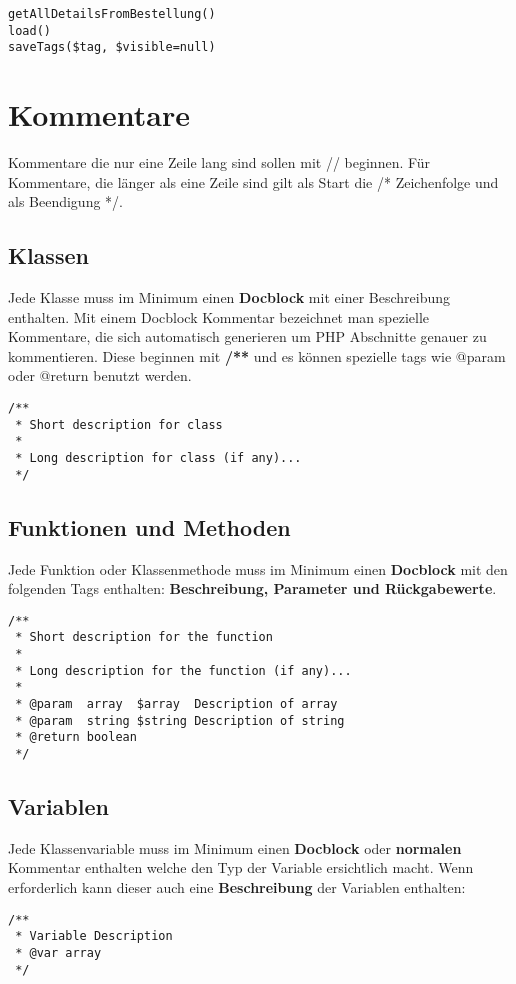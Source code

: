 \begin{verbatim}
getAllDetailsFromBestellung()
load()
saveTags($tag, $visible=null)
\end{verbatim}

\section{Kommentare}
Kommentare die nur eine Zeile lang sind sollen mit // beginnen. F\"ur Kommentare, die l\"anger als eine Zeile sind gilt als Start die /* Zeichenfolge und als Beendigung */. 

\subsection{Klassen}
Jede Klasse muss im Minimum einen {\bf Docblock} mit einer Beschreibung enthalten. \newline
Mit einem Docblock Kommentar bezeichnet man spezielle Kommentare, die sich automatisch generieren um PHP Abschnitte genauer zu kommentieren. Diese beginnen mit {\bf /**} und es k\"onnen spezielle tags wie @param oder @return benutzt werden. 

\begin{verbatim}
/**
 * Short description for class
 *
 * Long description for class (if any)...
 */
\end{verbatim}
 
\subsection{Funktionen und Methoden}
Jede Funktion oder Klassenmethode muss im Minimum einen {\bf Docblock} mit den folgenden Tags enthalten: {\bf Beschreibung, Parameter und R\"uckgabewerte}.
\begin{verbatim}
/**
 * Short description for the function
 *
 * Long description for the function (if any)...
 *
 * @param  array  $array  Description of array
 * @param  string $string Description of string
 * @return boolean 
 */
\end{verbatim}

\subsection{Variablen}
Jede Klassenvariable muss im Minimum einen {\bf Docblock} oder {\bf normalen} Kommentar enthalten welche den Typ der Variable ersichtlich macht. Wenn erforderlich kann dieser auch eine {\bf Beschreibung} der Variablen enthalten:
\begin{verbatim}
/**
 * Variable Description
 * @var array
 */
\end{verbatim}
